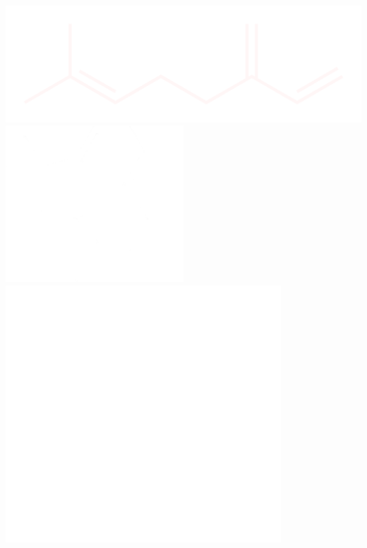 \documentclass{beamer}
\begin{document}
\begin{frame}
\begin{columns}
    \begin{column}{0.4\textwidth}
      \includegraphics[width=.8 \textwidth]{./brewing/hops/Myrcene-dark.pdf}
      \includegraphics[width=0.5\textwidth]{./brewing/hops/Humulene-dark.pdf}
      \includegraphics[width=.6\textwidth]{./brewing/hops/Beta-Caryophyllen-dark.pdf}
    \end{column}
  \end{columns}
\end{frame}
\end{document}
